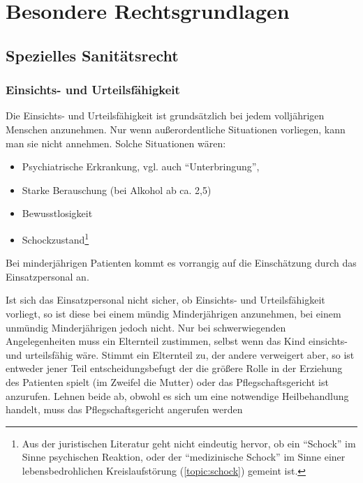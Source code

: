 \section{Besondere Rechtsgrundlagen}

\subsection{Spezielles Sanitätsrecht}



\subsubsection{Einsichts- und Urteilsfähigkeit}


\Text
{{\TxBeschreibung}}%
{%
\label{topic:urteilsfaehigkeit}%
Die Einsichts- und Urteilsfähigkeit ist grundsätzlich bei
jedem volljährigen Menschen anzunehmen. Nur wenn
außerordentliche Situationen vorliegen, kann man sie nicht
annehmen. Solche Situationen wären:

\begin{itemize}
  \item Psychiatrische Erkrankung, vgl. auch
  \enquote{Unterbringung},
  \item Starke Berauschung (bei Alkohol ab ca.
  2,5{\textperthousand})
  \item Bewusstlosigkeit
  \item Schockzustand\footnote{Aus der juristischen
  Literatur geht nicht eindeutig hervor, ob ein \enquote{Schock}
  im Sinne psychischen Reaktion, oder der \enquote{medizinische
  Schock} im Sinne einer
  lebensbedrohlichen Kreislaufstörung (\ref{topic:schock})
  gemeint ist.}
\end{itemize}

Bei minderjährigen Patienten kommt es vorrangig auf die
Einschätzung durch das Einsatzpersonal an. 

Ist sich das Einsatzpersonal nicht sicher, ob Einsichts- und
Urteilsfähigkeit vorliegt, so ist diese bei einem mündig
Minderjährigen anzunehmen, bei einem unmündig Minderjährigen
jedoch nicht.
Nur bei schwerwiegenden Angelegenheiten muss ein Elternteil
zustimmen, selbst wenn das Kind einsichts- und urteilsfähig
wäre.
Stimmt ein Elternteil zu, der andere verweigert aber, so ist
entweder jener Teil entscheidungsbefugt der die größere
Rolle in der Erziehung des Patienten spielt (im Zweifel
die Mutter) oder das
Pflegschaftsgericht ist
anzurufen. Lehnen beide ab, obwohl es sich um eine
notwendige Heilbehandlung handelt, muss das
Pflegschaftsgericht angerufen werden
}%



